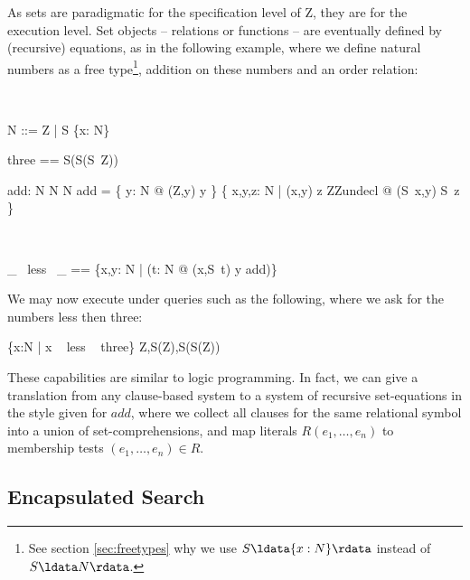 \documentclass{article}
\begin{document}
As sets are paradigmatic for the specification level of Z, they are
for the execution level. Set objects -- relations or functions -- are
eventually defined by (recursive) equations, as in the following
example, where we define natural numbers as a free type\footnote{See
  section \ref{sec:freetypes} why we use $S \ldata \{x:N\} \rdata$
  instead of $S \ldata N \rdata$.}, addition on these numbers and an
order relation:

\begin{zedgroup}
\begin{zdirectives}
\end{zdirectives} \\
\begin{zed}
  N ::= Z | S \ldata \{x: N\} \rdata    
\end{zed}
\begin{axdef}
  three == S(S(S~Z))
\end{axdef}
\begin{axdef}
  add: N \cross N \fun N
\where
  add = \< 
     \{ y: N @ (Z,y) \mapsto y \} \cup %
     \{ x,y,z: N | (x,y) \mapsto z \in ZZundecl @ (S~x,y) \mapsto S~z \}
   \>
\end{axdef}
\begin{zdirectives}
\end{zdirectives} \\
\begin{axdef}
  \_ ~less~ \_ == \{x,y: N | (\exists t: N @ (x,S~t) \mapsto y \in add)\}
\end{axdef}
\end{zedgroup}

We may now execute under \Zeta{} queries such as the following, 
where we ask for the numbers less then three:

\begin{zexecexpr}
  \{x:N | x ~ less ~ three\}
\yields
{Z,S(Z),S(S(Z))}
\end{zexecexpr}

These capabilities are similar to logic programming.  In
fact, we can give a translation from any clause-based system to a
system of recursive set-equations in the style given for $add$, where
we collect all clauses for the same relational symbol into a union of
set-comprehensions, and map literals $R(e_1,\ldots,e_n)$ to membership
tests $(e_1,\ldots,e_n) \in R$.

\subsection{Encapsulated Search}
\label{sec:esearch}
\end{document}
